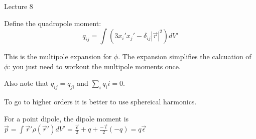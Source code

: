 \begin{center}

Lecture 8

\end{center}

Define the quadropole moment: $$q_{ij} = \int \left(3 x_i' x_j' - \delta_{ij} |\vec{r}|^2\right) dV'$$

This is the multipole expansion for $\phi$. The expansion simplifies the calcuation of $\phi$: you just need to workout the multipole moments once.

Also note that $q_{ij} = q_{ji}$ and $\sum_i q_ii = 0$.

To go to higher orders it is better to use sphereical harmonics.

For a point dipole, the dipole moment is $\vec{p} = \int \vec{r}' \rho(\vec{r}') dV' = \frac{\vec{\epsilon}}{2} + q + \frac{-\vec{\epsilon}}{2} (-q) = q \vec{\epsilon}$